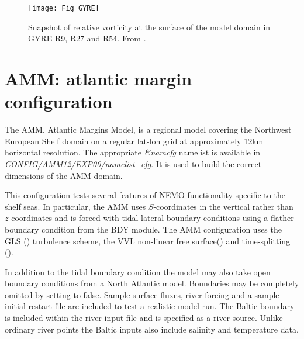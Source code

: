 \documentclass[../main/NEMO_manual]{subfiles}
\begin{document}
\begin{figure}[!t]
  \begin{center}
    \texttt{[image: Fig\_GYRE]}
    \caption{
      \protect\label{fig:GYRE}
      Snapshot of relative vorticity at the surface of the model domain in GYRE R9, R27 and R54.
      From \citet{Levy_al_OM10}.
    }
  \end{center}
\end{figure}

\section{AMM: atlantic margin configuration}
\label{sec:MISC_config_AMM}

The AMM, Atlantic Margins Model, is a regional model covering the Northwest European Shelf domain on
a regular lat-lon grid at approximately 12km horizontal resolution.
The appropriate \textit{\&namcfg} namelist  is available in \textit{CONFIG/AMM12/EXP00/namelist\_cfg}.
It is used to build the correct dimensions of the AMM domain.

This configuration tests several features of NEMO functionality specific to the shelf seas.
In particular, the AMM uses $S$-coordinates in the vertical rather than $z$-coordinates and
is forced with tidal lateral boundary conditions using a flather boundary condition from the BDY module.
The AMM configuration uses the GLS () turbulence scheme,
the VVL non-linear free surface() and time-splitting ().

In addition to the tidal boundary condition the model may also take open boundary conditions from
a North Atlantic model.
Boundaries may be completely omitted by setting  to false.
Sample surface fluxes, river forcing and a sample initial restart file are included to test a realistic model run.
The Baltic boundary is included within the river input file and is specified as a river source.
Unlike ordinary river points the Baltic inputs also include salinity and temperature data.

\biblio
\end{document}
